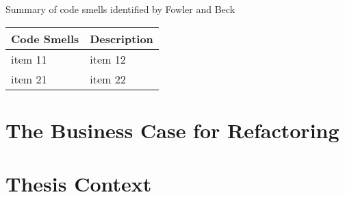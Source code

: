 Summary of code smells identified by Fowler and Beck \textcite{fowler2018}

\begin{tabularx}{\textwidth}{XX}
 Code Smells & Description \\
 \hline
 item 11 & item 12  \\
 item 21  & item 22  \\
\end{tabularx}


\section{The Business Case for Refactoring}
\label{sec:Business}

\section{Thesis Context}
